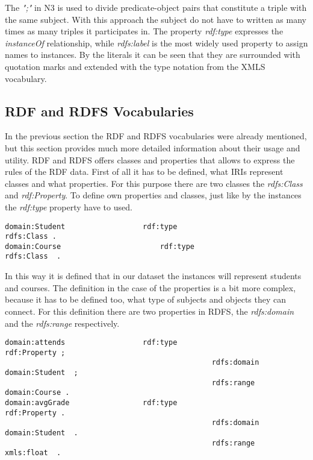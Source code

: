 The \textit{";"} in N3 is used to divide predicate-object pairs that constitute a triple with the same subject. With this approach the subject do not have to written as many times as many triples it participates in. The property \textit{rdf:type} expresses the \textit{instanceOf} relationship, while \textit{rdfs:label} is the most widely used property to assign names to instances. By the literals it can be seen that they are surrounded with quotation marks and extended with the type notation from the XMLS vocabulary.

\subsection{RDF and RDFS Vocabularies}

In the previous section the RDF and RDFS vocabularies were already mentioned, but this section provides much more detailed information about their usage and utility. RDF and RDFS offers classes and properties that allows to express the rules of the RDF data. First of all it has to be defined, what IRIs represent classes and what properties. For this purpose there are two classes the \textit{rdfs:Class} and \textit{rdf:Property}. To define own properties and classes, just like by the instances the \textit{rdf:type} property have to used.

\begin{lstlisting}[basicstyle=\footnotesize, captionpos=b, caption=Class definition, label=lst:sparql, belowskip=1em, aboveskip=4em,
frame=single]
domain:Student					rdf:type						rdfs:Class .
domain:Course						rdf:type						rdfs:Class	.
\end{lstlisting}


In this way it is defined that in our dataset the instances will represent students and courses. The definition in the case of the properties is a bit more complex, because it has to be defined too, what type of subjects and objects they can connect. For this definition there are two properties in RDFS, the \textit{rdfs:domain} and the \textit{rdfs:range} respectively.

\begin{lstlisting}[basicstyle=\footnotesize, captionpos=b, caption=Property definition I., label=lst:sparql,  belowskip=1em, aboveskip=2em,
frame=single]
domain:attends					rdf:type						rdf:Property ;
												rdfs:domain					domain:Student	;
												rdfs:range					domain:Course .
domain:avgGrade					rdf:type						rdf:Property .
												rdfs:domain					domain:Student	.
												rdfs:range					xmls:float	.
\end{lstlisting}

